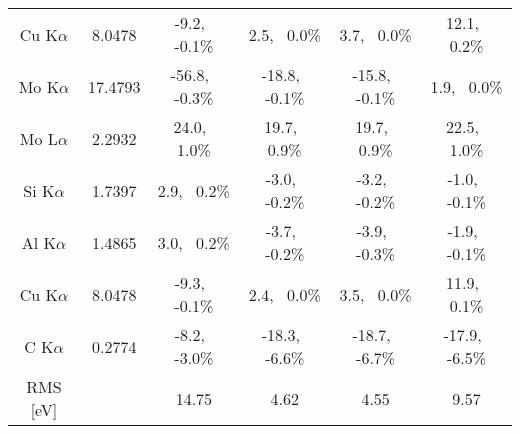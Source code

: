 \begin{table}[p]
\begin{tabular}{cccccc}
        Cu K$\alpha$ & 8.0478            & -9.2,\,\,\,   -0.1\%  & 2.5,\,\,\,    0.0\%   & 3.7,\,\,\,    0.0\%   & 12.1,\,\,\,    0.2\%  \\
        Mo K$\alpha$ & 17.4793           & -56.8,\,\,\,   -0.3\% & -18.8,\,\,\,   -0.1\% & -15.8,\,\,\,   -0.1\% & 1.9,\,\,\,    0.0\%   \\
        Mo L$\alpha$ & 2.2932            & 24.0,\,\,\,    1.0\%  & 19.7,\,\,\,    0.9\%  & 19.7,\,\,\,    0.9\%  & 22.5,\,\,\,    1.0\%  \\
        Si K$\alpha$ & 1.7397            & 2.9,\,\,\,    0.2\%   & -3.0,\,\,\,   -0.2\%  & -3.2,\,\,\,   -0.2\%  & -1.0,\,\,\,   -0.1\%  \\
        Al K$\alpha$ & 1.4865            & 3.0,\,\,\,    0.2\%   & -3.7,\,\,\,   -0.2\%  & -3.9,\,\,\,   -0.3\%  & -1.9,\,\,\,   -0.1\%  \\
        Cu K$\alpha$ & 8.0478            & -9.3,\,\,\,   -0.1\%  & 2.4,\,\,\,    0.0\%   & 3.5,\,\,\,    0.0\%   & 11.9,\,\,\,    0.1\%  \\
        C K$\alpha$  & 0.2774            & -8.2,\,\,\,   -3.0\%  & -18.3,\,\,\,   -6.6\% & -18.7,\,\,\,   -6.7\% & -17.9,\,\,\,   -6.5\% \\
        \hline
        RMS  [eV]    &                   & 14.75                 & 4.62                  & 4.55                  & 9.57
    \end{tabular}
\end{table}